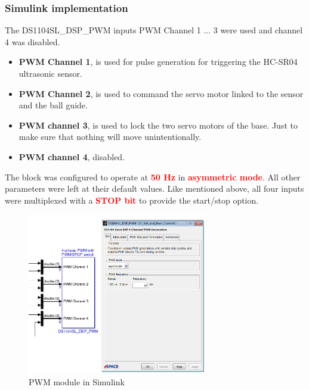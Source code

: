 \subsubsection{Simulink implementation}
The DS1104SL\_DSP\_PWM inputs PWM Channel 1 ... 3 were used and channel 4 was disabled.
\begin{itemize}
    \item \textbf{PWM Channel 1}, is used for pulse generation for triggering the HC-SR04 ultrasonic sensor.
    \item \textbf{PWM Channel 2}, is used to command the servo motor linked to the sensor and the ball guide.
    \item \textbf{PWM channel 3}, is used to lock the two servo motors of the base. Just to make sure that nothing will move unintentionally.
    \item \textbf{PWM channel 4}, disabled.
\end{itemize}
The block was configured to operate at \textcolor{red}{\textbf{50 Hz}} in \textcolor{red}{\textbf{asymmetric mode}}. All other parameters were left at their default values.
Like mentioned above, all four inputs were multiplexed with a \textcolor{red}{\textbf{STOP bit}} to provide the start/stop option.
    \begin{figure}[H]
        \centering
        \includegraphics[width=0.7\textwidth]{Images/Ball and Bean/MatLab17.png}
        \caption{PWM module in Simulink}
        \label{fig18}
    \end{figure}

